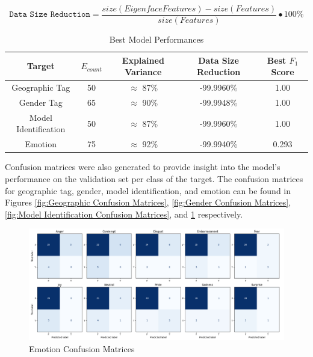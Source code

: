 \documentclass[journal]{new-aiaa}
\begin{document}
\begin{equation}\label{eqn:data size reduction}
  \texttt{Data Size Reduction} = \frac{size(EigenfaceFeatures) - size(Features)}{size(Features)}\bullet 100\%
\end{equation}

\begin{table}[H]
  \centering
  \begin{tabular}{|| c | c | c | c | c ||} 
          \hline
          Target               & $E_{count}$ & Explained Variance & Data Size Reduction & Best $F_1$ Score \\ [0.5ex] 
          \hline\hline
          Geographic Tag       & 50 & $\approx$ 87\% & -99.9960\% & 1.00 \\ [0.5ex] 
          \hline
          Gender Tag           & 65 & $\approx$ 90\% & -99.9948\% & 1.00 \\ [0.5ex] 
          \hline
          Model Identification & 50 & $\approx$ 87\% & -99.9960\% & 1.00 \\ [0.5ex] 
          \hline
          Emotion              & 75 & $\approx$ 92\% & -99.9940\% & 0.293 \\ [0.5ex] 
          \hline
  \end{tabular}
  \caption{Best Model Performances}
  \label{table:Best Model Performances}
\end{table}

Confusion matrices were also generated to provide insight into the model's performance on the validation set per class of the target.
The confusion matrices for geographic tag, gender, model identification, and emotion can be found in Figures \ref{fig:Geographic Confusion Matrices}, \ref{fig:Gender Confusion Matrices}, \ref{fig:Model Identification Confusion Matrices}, and \ref{fig:Emotion Confusion Matrices} respectively.

\begin{figure}[H]
  \centering
  \includegraphics[width=\textwidth]{figures/emotion_tag_cm.png}
  \caption{Emotion Confusion Matrices}
  \label{fig:Emotion Confusion Matrices}
\end{figure}
\end{document}
